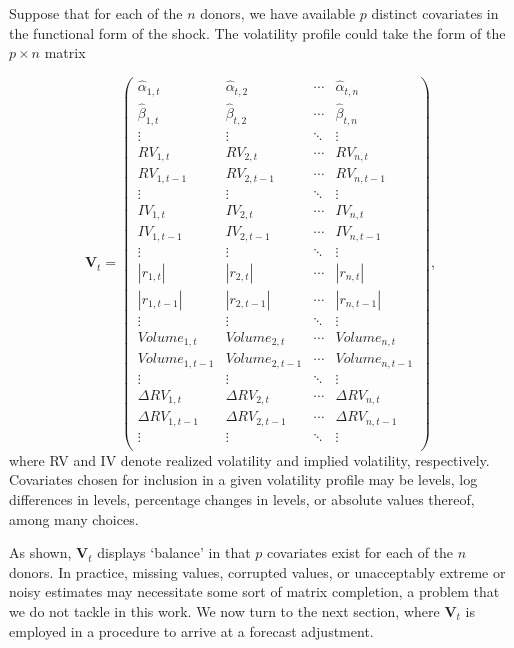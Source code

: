 \documentclass[11pt,3p,review,authoryear]{elsarticle}
\theoremstyle{definition}
\begin{document}
    Suppose that for each of the $n$ donors, we have available $p$ distinct covariates in the functional form of the shock.  The volatility profile could take the form of the $p \times n$ matrix 

    \begin{equation*}
      \textbf{V}_{t} = 
      \begin{pmatrix}
      \hat\alpha_{1,t} & \hat\alpha_{t,2}  & \cdots & \hat\alpha_{t,n}  \\
      \hat\beta_{1,t} & \hat\beta_{t,2}  & \cdots & \hat\beta_{t,n}  \\
      \vdots  & \vdots  & \ddots & \vdots  \\
      RV_{1,t} & RV_{2,t}  & \cdots & RV_{n,t}  \\
      RV_{1,t-1}  & RV_{2,t-1}  & \cdots & RV_{n,t-1}  \\
      \vdots  & \vdots  & \ddots & \vdots  \\
      IV_{1,t} & IV_{2,t} & \cdots & IV_{n,t} \\
      IV_{1,t-1}  & IV_{2,t-1}  & \cdots & IV_{n,t-1} \\
      \vdots  & \vdots  & \ddots & \vdots  \\
      |r_{1,t}| & |r_{2,t}| & \cdots & |r_{n,t}| \\
      |r_{1,t-1}|  & |r_{2,t-1}|  & \cdots & |r_{n,t-1}| \\
      \vdots  & \vdots  & \ddots & \vdots  \\
      Volume_{1,t}  & Volume_{2,t}  & \cdots & Volume_{n,t} \\
      Volume_{1,t-1}  & Volume_{2,t-1}  & \cdots & Volume_{n,t-1}  \\
      \vdots  & \vdots  & \ddots & \vdots  \\
      \Delta RV_{1,t} & \Delta RV_{2,t}  & \cdots & \Delta RV_{n,t}  \\
      \Delta RV_{1,t-1}  & \Delta RV_{2,t-1}  & \cdots & \Delta RV_{n,t-1}  \\
      \vdots  & \vdots  & \ddots & \vdots  \\
      \end{pmatrix},
      \end{equation*}
      where RV and IV denote realized volatility and implied volatility, respectively.  Covariates chosen for inclusion in a given volatility profile may be levels, log differences in levels, percentage changes in levels, or absolute values thereof, among many choices.

      As shown, $\textbf{V}_{t}$ displays `balance' in that $p$ covariates exist for each of the $n$ donors.  In practice, missing values, corrupted values, or unacceptably extreme or noisy estimates may necessitate some sort of matrix completion, a problem that we do not tackle in this work.  We now turn to the next section, where $\textbf{V}_{t}$ is employed in a procedure to arrive at a forecast adjustment. 
    
\end{document}
